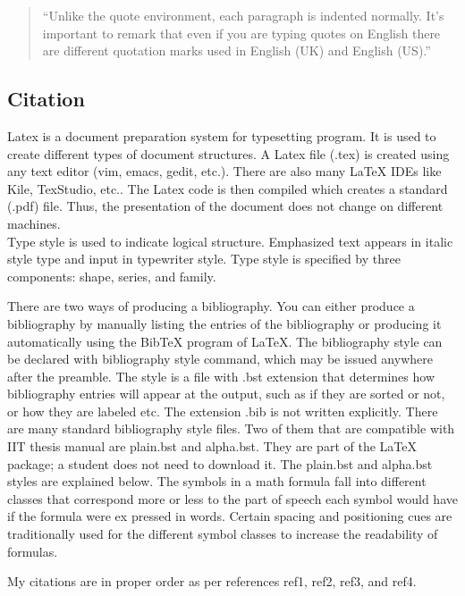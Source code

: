 \documentclass{article}
\begin{document}
\begin{quote}


    \qquad \enquote{Unlike the quote environment, each paragraph is indented normally. It’s important to remark that even if you are typing quotes on English there are different quotation marks used in English (UK) and English (US).}
\end{quote}

\subsection{Citation}
Latex \cite{latex} is a document preparation system for typesetting program. It is used to create different types of document structures. A Latex file (.tex) is created using any text editor (vim, emacs, gedit, etc.). There are also many LaTeX IDEs like Kile, TexStudio, etc.. The Latex code is then compiled which creates a standard (.pdf) file. Thus, the presentation of the document does not change on different machines.\\
Type style \cite{leslie} is used to indicate logical structure. Emphasized text appears in italic style type and input in typewriter style. Type style is specified by three components: shape, series, and family.

\newpage


There are two ways of producing a bibliography\cite{helmut}. You can either produce a bibliography by manually listing the entries of the bibliography or producing it automatically using the BibTeX program of LaTeX. The bibliography style can be declared with bibliography style command, which may be issued anywhere after the preamble. The style is a file with .bst extension that determines how bibliography entries will appear at the output, such as if they are sorted or not, or how they are labeled etc. The extension .bib is not written explicitly. There are many standard bibliography style files. Two of them that are compatible with IIT thesis manual are plain.bst and alpha.bst. They are part of the LaTeX package; a student does not need to download it. The plain.bst and alpha.bst styles are explained below. The symbols in a math formula fall into different classes that correspond more or less to the part of speech each symbol would have if the formula were ex pressed in words. Certain spacing and positioning cues are traditionally used for the different symbol classes to increase the readability of formulas.\cite{michael}

My citations are in proper order as per references ref1, ref2, ref3, and ref4.
\end{document}
